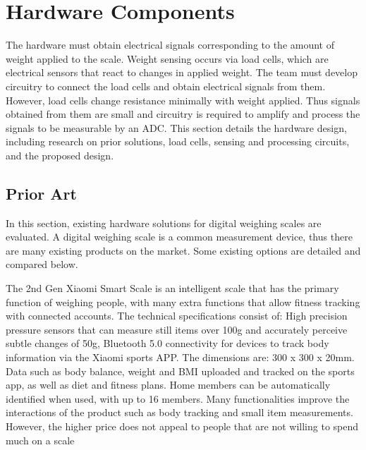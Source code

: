 
\chapter{Hardware Components}

The hardware must obtain electrical signals corresponding to the amount of weight applied to the scale. Weight sensing occurs via load cells, which are electrical sensors that react to changes in applied weight. The team must develop circuitry to connect the load cells and obtain electrical signals from them. However, load cells change resistance minimally with weight applied. Thus signals obtained from them are small and circuitry is required to amplify and process the signals to be measurable by an ADC. This section details the hardware design, including research on prior solutions, load cells, sensing and processing circuits, and the proposed design.

\section{Prior Art}

In this section, existing hardware solutions for digital weighing scales are evaluated. A digital weighing scale is a common measurement device, thus there are many existing products on the market. Some existing options are detailed and compared below.

The 2nd Gen Xiaomi Smart Scale is an intelligent scale that has the primary function of weighing people, with many extra functions that allow fitness tracking with connected accounts. The technical specifications consist of: High precision pressure sensors that can measure still items over 100g and accurately perceive subtle changes of 50g, Bluetooth 5.0 connectivity for devices to track body information via the Xiaomi sports APP. The dimensions are: 300 x 300 x 20mm. Data such as body balance, weight and BMI uploaded and tracked on the sports app, as well as diet and fitness plans. Home members can be automatically identified when used, with up to 16 members. Many functionalities improve the interactions of the product such as body tracking and small item measurements. However, the higher price does not appeal to people that are not willing to spend much on a scale

